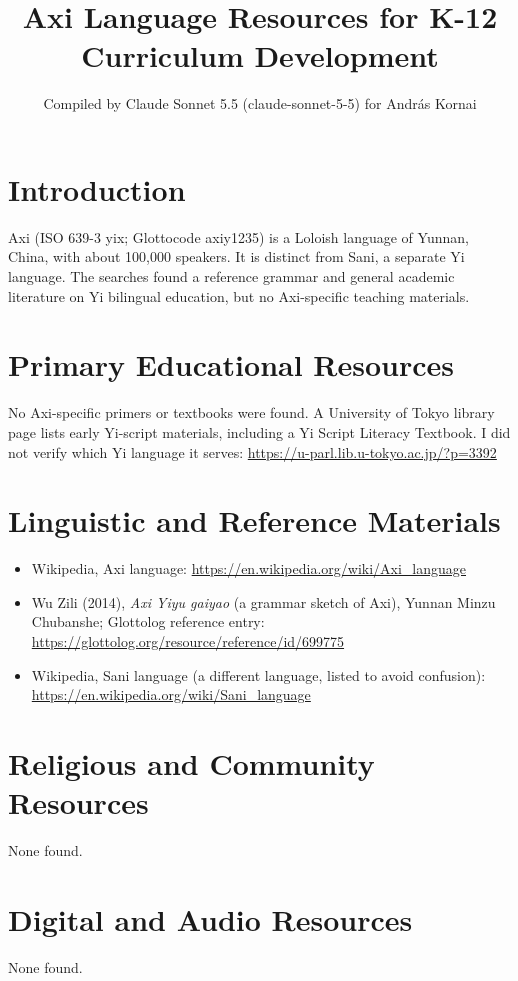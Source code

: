 \documentclass[12pt]{article}
\title{Axi Language Resources for K-12 Curriculum Development}
\author{Compiled by Claude Sonnet 5.5 (claude-sonnet-5-5) for Andr\'as Kornai}
\date{}
\begin{document}
\maketitle

\section{Introduction}
Axi (ISO 639-3 yix; Glottocode axiy1235) is a Loloish language of Yunnan, China, with about 100,000 speakers. It is distinct from Sani, a separate Yi language. The searches found a reference grammar and general academic literature on Yi bilingual education, but no Axi-specific teaching materials.

\section{Primary Educational Resources}
No Axi-specific primers or textbooks were found. A University of Tokyo library page lists early Yi-script materials, including a Yi Script Literacy Textbook. I did not verify which Yi language it serves: \url{https://u-parl.lib.u-tokyo.ac.jp/?p=3392}

\section{Linguistic and Reference Materials}
\begin{itemize}
\item Wikipedia, Axi language: \url{https://en.wikipedia.org/wiki/Axi_language}
\item Wu Zili (2014), \emph{Axi Yiyu gaiyao} (a grammar sketch of Axi), Yunnan Minzu Chubanshe; Glottolog reference entry: \url{https://glottolog.org/resource/reference/id/699775}
\item Wikipedia, Sani language (a different language, listed to avoid confusion): \url{https://en.wikipedia.org/wiki/Sani_language}
\end{itemize}

\section{Religious and Community Resources}
None found.

\section{Digital and Audio Resources}
None found.
\end{document}

